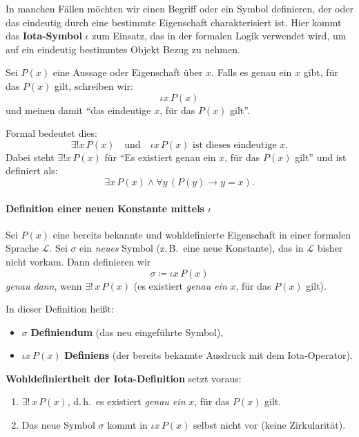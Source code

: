 \documentclass[main.tex]{subfiles}
\begin{document}
In manchen Fällen möchten wir einen Begriff oder ein Symbol definieren, der oder das eindeutig durch eine bestimmte Eigenschaft charakterisiert ist. Hier kommt das \textbf{Iota-Symbol} \( \iota \) zum Einsatz, das in der formalen Logik verwendet wird, um auf ein eindeutig bestimmtes Objekt Bezug zu nehmen.

\begin{definition}
Sei \( P(x) \) eine Aussage oder Eigenschaft über \( x \). Falls es genau ein \( x \) gibt, für das \( P(x) \) gilt, schreiben wir:
\[
\iota x \, P(x)
\]
und meinen damit \enquote{das eindeutige \( x \), für das \( P(x) \) gilt}.

Formal bedeutet dies:
\[
\exists! x \, P(x) \quad \text{und} \quad \iota x \, P(x) \text{ ist dieses eindeutige } x.
\]
Dabei steht \( \exists! x \, P(x) \) für \enquote{Es existiert genau ein \( x \), für das \( P(x) \) gilt} und ist definiert als:
\[
\exists x \, P(x) \land \forall y \, (P(y) \rightarrow y = x).
\]
\end{definition}

\paragraph{Definition einer neuen Konstante mittels \(\iota\)}

\begin{definition}
Sei \(P(x)\) eine bereits bekannte und wohldefinierte Eigenschaft in einer formalen Sprache \(\mathcal{L}\). Sei \(\sigma\) ein \emph{neues} Symbol (z.\,B.\ eine neue Konstante), das in \(\mathcal{L}\) bisher nicht vorkam. Dann definieren wir
\[
\sigma \coloneqq \iota x\,P(x)
\]
\emph{genau dann}, wenn \(\exists!\,x\,P(x)\) (es existiert \emph{genau ein} \(x\), für das \(P(x)\) gilt). 

\noindent
In dieser Definition heißt:
\begin{itemize}
    \item \(\sigma\) \textbf{Definiendum} (das neu eingeführte Symbol),
    \item \(\iota x\,P(x)\) \textbf{Definiens} (der bereits bekannte Ausdruck mit dem Iota-Operator).
\end{itemize}

\noindent
\textbf{Wohldefiniertheit der Iota-Definition} setzt voraus:
\begin{enumerate}
    \item \(\exists!\,x\,P(x)\), d.\,h.\ es existiert \emph{genau ein} \(x\), für das \(P(x)\) gilt.
    \item Das neue Symbol \(\sigma\) kommt in \(\iota x\,P(x)\) selbst nicht vor (keine Zirkularität).
\end{enumerate}
\end{definition}
\end{document}
